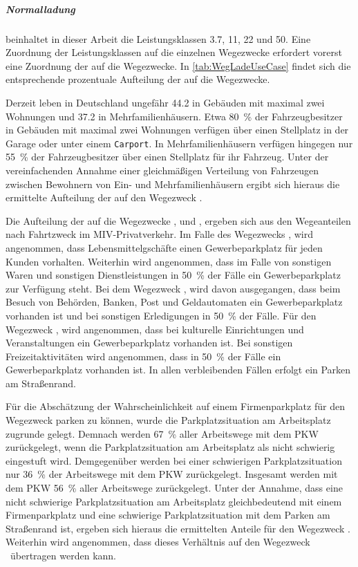 \subparagraph{Normalladung} beinhaltet in dieser Arbeit die Leistungsklassen \SI{3.7}{\kw}, \SI{11}{\kw}, \SI{22}{\kw} und \SI{50}{\kw}.
Eine Zuordnung der Leistungsklassen auf die einzelnen Wegezwecke erfordert vorerst eine Zuordnung der \UCs auf die Wegezwecke.
In \autoref{tab:WegLadeUseCase} findet sich die entsprechende prozentuale Aufteilung der \UCs auf die Wegezwecke.



Derzeit leben in Deutschland ungefähr \SI{44.2}{\MioMen} in Gebäuden mit maximal zwei Wohnungen und \SI{37.2}{\MioMen} in Mehrfamilienhäusern.
Etwa \SI{80}{\percent} der Fahrzeugbesitzer in Gebäuden mit maximal zwei Wohnungen verfügen über einen Stellplatz in der Garage oder unter einem \texttt{Carport}.
In Mehrfamilienhäusern verfügen hingegen nur \SI{55}{\percent} der Fahrzeugbesitzer über einen Stellplatz für ihr Fahrzeug. \cite{dena2020}
Unter der vereinfachenden Annahme einer gleichmäßigen Verteilung von Fahrzeugen zwischen Bewohnern von Ein- und Mehrfamilienhäusern ergibt sich hieraus die ermittelte Aufteilung der \UCs auf den Wegezweck \nHdot.\medskip

Die Aufteilung der \UCs auf die Wegezwecke \Einkaufdot, \Erledigung und \Freizeitdot, ergeben sich aus den Wegeanteilen nach Fahrtzweck im \gls{MIV}-Privatverkehr. \cite{Rikus2015}
Im Falle des Wegezwecks \Einkaufdot, wird angenommen, dass Lebensmittelgschäfte einen Gewerbeparkplatz für jeden Kunden vorhalten.
Weiterhin wird angenommen, dass im Falle von sonstigen Waren und sonstigen Dienstleistungen in \SI{50}{\percent} der Fälle ein Gewerbeparkplatz zur Verfügung steht.
Bei dem Wegezweck \Erledigungdot, wird davon ausgegangen, dass beim Besuch von Behörden, Banken, Post und Geldautomaten ein Gewerbeparkplatz vorhanden ist und bei sonstigen Erledigungen in \SI{50}{\percent} der Fälle.
Für den Wegezweck \Freizeitdot, wird angenommen, dass bei kulturelle Einrichtungen und Veranstaltungen ein Gewerbeparkplatz vorhanden ist.
Bei sonstigen Freizeitaktivitäten wird angenommen, dass in \SI{50}{\percent} der Fälle ein Gewerbeparkplatz vorhanden ist.
In allen verbleibenden Fällen erfolgt ein Parken am Straßenrand.\medskip

Für die Abschätzung der Wahrscheinlichkeit auf einem Firmenparkplatz für den Wegezweck \Arbeit parken zu können, wurde die Parkplatzsituation am Arbeitsplatz zugrunde gelegt.
Demnach werden \SI{67}{\percent} aller Arbeitswege mit dem \gls{PKW} zurückgelegt, wenn die Parkplatzsituation am Arbeitsplatz als nicht schwierig eingestuft wird.
Demgegenüber werden bei einer schwierigen Parkplatzsituation nur \SI{36}{\percent} der Arbeitswege mit dem \gls{PKW} zurückgelegt.
Insgesamt werden mit dem \gls{PKW} \SI{56}{\percent} aller Arbeitswege zurückgelegt. \cite{Ecke2020}
Unter der Annahme, dass eine nicht schwierige Parkplatzsituation am Arbeitsplatz gleichbedeutend mit einem Firmenparkplatz und eine schwierige Parkplatzsituation mit dem Parken am Straßenrand ist, ergeben sich hieraus die ermittelten Anteile für den Wegezweck \Arbeitdot.
Weiterhin wird angenommen, dass dieses Verhältnis auf den Wegezweck \Ausbildung~übertragen werden kann.\medskip


